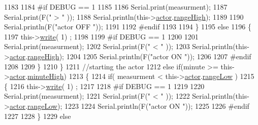 \begin{DoxyCode}
1183 
1184 \textcolor{preprocessor}{            #if DEBUG == 1 }
1185 
1186                 Serial.print(measurment);
1187                 Serial.print(F(\textcolor{stringliteral}{" > "} ));
1188                 Serial.println(this->\hyperlink{class_cool_board_actor_a8f190db9f7a39fddbcef7f152da970e9}{actor}.\hyperlink{struct_cool_board_actor_1_1state_a6e5cd6c5cd44e2decfd8d4df1853f8e3}{rangeHigh});
1189 
1190                 Serial.println(F(\textcolor{stringliteral}{"actor OFF "}));
1191 
1192 \textcolor{preprocessor}{            #endif}
1193     
1194             \}
1195             \textcolor{keywordflow}{else} 
1196             \{
1197                 this->\hyperlink{class_cool_board_actor_a958786ff01ea1056ee72c72d439f86da}{write}( 1) ;
1198 
1199 \textcolor{preprocessor}{            #if DEBUG == 1 }
1200 
1201                 Serial.print(measurment);
1202                 Serial.print(F(\textcolor{stringliteral}{" < "} ));
1203                 Serial.println(this->\hyperlink{class_cool_board_actor_a8f190db9f7a39fddbcef7f152da970e9}{actor}.\hyperlink{struct_cool_board_actor_1_1state_a6e5cd6c5cd44e2decfd8d4df1853f8e3}{rangeHigh});
1204 
1205                 Serial.println(F(\textcolor{stringliteral}{"actor ON "}));
1206 
1207 \textcolor{preprocessor}{            #endif  }
1208                 
1209             \}
1210     \}   
1211     \textcolor{comment}{//starting the actor}
1212     \textcolor{keywordflow}{else} \textcolor{keywordflow}{if}(minute >= this->\hyperlink{class_cool_board_actor_a8f190db9f7a39fddbcef7f152da970e9}{actor}.\hyperlink{struct_cool_board_actor_1_1state_a4bff3d61ead74adb60be224764b93006}{minuteHigh})
1213     \{
1214             \textcolor{keywordflow}{if}( measurment < this->\hyperlink{class_cool_board_actor_a8f190db9f7a39fddbcef7f152da970e9}{actor}.\hyperlink{struct_cool_board_actor_1_1state_a43f891c9fb3bb63575c27cec860de55a}{rangeLow} )
1215             \{
1216                 this->\hyperlink{class_cool_board_actor_a958786ff01ea1056ee72c72d439f86da}{write}( 1) ;
1217 
1218 \textcolor{preprocessor}{            #if DEBUG == 1 }
1219 
1220                 Serial.print(measurment);
1221                 Serial.print(F(\textcolor{stringliteral}{" < "} ));
1222                 Serial.println(this->\hyperlink{class_cool_board_actor_a8f190db9f7a39fddbcef7f152da970e9}{actor}.\hyperlink{struct_cool_board_actor_1_1state_a43f891c9fb3bb63575c27cec860de55a}{rangeLow});
1223 
1224                 Serial.println(F(\textcolor{stringliteral}{"actor ON "}));
1225 
1226 \textcolor{preprocessor}{            #endif  }
1227 
1228             \}
1229             \textcolor{keywordflow}{else} 

\end{DoxyCode}
